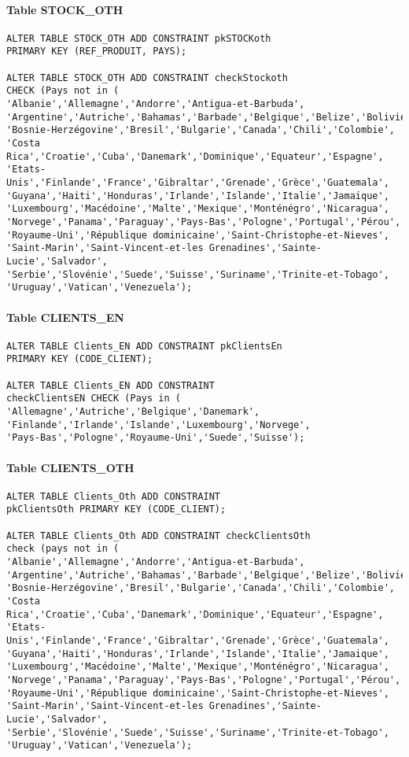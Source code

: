 \documentclass[10pt,a4paper,twoside]{article}
\begin{document}
\paragraph{Table STOCK\_OTH}
\begin{verbatim}
ALTER TABLE STOCK_OTH ADD CONSTRAINT pkSTOCKoth 
PRIMARY KEY (REF_PRODUIT, PAYS);

ALTER TABLE STOCK_OTH ADD CONSTRAINT checkStockoth 
CHECK (Pays not in (
'Albanie','Allemagne','Andorre','Antigua-et-Barbuda',
'Argentine','Autriche','Bahamas','Barbade','Belgique','Belize','Bolivie',
'Bosnie-Herzégovine','Bresil','Bulgarie','Canada','Chili','Colombie',
'Costa Rica','Croatie','Cuba','Danemark','Dominique','Equateur','Espagne',
'Etats-Unis','Finlande','France','Gibraltar','Grenade','Grèce','Guatemala',
'Guyana','Haiti','Honduras','Irlande','Islande','Italie','Jamaique',
'Luxembourg','Macédoine','Malte','Mexique','Monténégro','Nicaragua',
'Norvege','Panama','Paraguay','Pays-Bas','Pologne','Portugal','Pérou',
'Royaume-Uni','République dominicaine','Saint-Christophe-et-Nieves',
'Saint-Marin','Saint-Vincent-et-les Grenadines','Sainte-Lucie','Salvador',
'Serbie','Slovénie','Suede','Suisse','Suriname','Trinite-et-Tobago',
'Uruguay','Vatican','Venezuela');
\end{verbatim}

\paragraph{Table CLIENTS\_EN}
\begin{verbatim}
ALTER TABLE Clients_EN ADD CONSTRAINT pkClientsEn 
PRIMARY KEY (CODE_CLIENT);

ALTER TABLE Clients_EN ADD CONSTRAINT 
checkClientsEN CHECK (Pays in (
'Allemagne','Autriche','Belgique','Danemark',
'Finlande','Irlande','Islande','Luxembourg','Norvege',
'Pays-Bas','Pologne','Royaume-Uni','Suede','Suisse');
\end{verbatim}

\paragraph{Table CLIENTS\_OTH}
\begin{verbatim}
ALTER TABLE Clients_Oth ADD CONSTRAINT 
pkClientsOth PRIMARY KEY (CODE_CLIENT);

ALTER TABLE Clients_Oth ADD CONSTRAINT checkClientsOth 
check (pays not in (
'Albanie','Allemagne','Andorre','Antigua-et-Barbuda',
'Argentine','Autriche','Bahamas','Barbade','Belgique','Belize','Bolivie',
'Bosnie-Herzégovine','Bresil','Bulgarie','Canada','Chili','Colombie',
'Costa Rica','Croatie','Cuba','Danemark','Dominique','Equateur','Espagne',
'Etats-Unis','Finlande','France','Gibraltar','Grenade','Grèce','Guatemala',
'Guyana','Haiti','Honduras','Irlande','Islande','Italie','Jamaique',
'Luxembourg','Macédoine','Malte','Mexique','Monténégro','Nicaragua',
'Norvege','Panama','Paraguay','Pays-Bas','Pologne','Portugal','Pérou',
'Royaume-Uni','République dominicaine','Saint-Christophe-et-Nieves',
'Saint-Marin','Saint-Vincent-et-les Grenadines','Sainte-Lucie','Salvador',
'Serbie','Slovénie','Suede','Suisse','Suriname','Trinite-et-Tobago',
'Uruguay','Vatican','Venezuela');
\end{verbatim}
\end{document}
